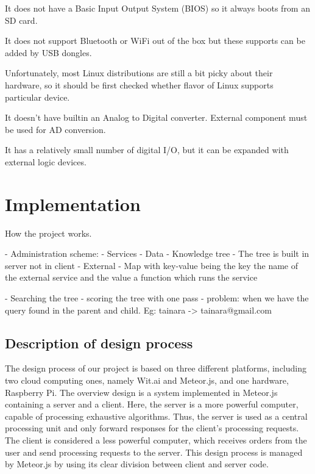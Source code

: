 It does not have a Basic Input Output System (BIOS) so it always boots from an SD card.

It does not support Bluetooth or WiFi out of the box but these supports can be added by USB dongles.

Unfortunately, most Linux distributions are still a bit
picky about their hardware, so it should be first checked whether flavor of Linux supports particular device.

It doesn’t have builtin an Analog to Digital converter. External component must be used for AD conversion.

It has a relatively small number of digital I/O, but it can be expanded with external logic devices.

\section{Implementation}



How the project works.

- Administration scheme:
    - Services
        - Data
            - Knowledge tree
                - The tree is built in server not in client
        - External
            - Map with key-value being the key the name of the external service and the value a function which runs the service

- Searching the tree
    - scoring the tree with one pass
    - problem: when we have the query found in the parent and child. Eg: tainara -> tainara@gmail.com

\subsection{Description of design process}

The design process of our project is based on three different platforms, including two cloud computing ones, namely Wit.ai and Meteor.js, and one hardware, Raspberry Pi.
The overview design is a system implemented in Meteor.js containing a server and a client.
Here, the server is a more powerful computer, capable of processing exhaustive algorithms.
Thus, the server is used as a central processing unit and only forward responses for the client's processing requests.
The client is considered a less powerful computer, which receives orders from the user and send processing requests to the server.
This design process is managed by Meteor.js by using its clear division between client and server code.


